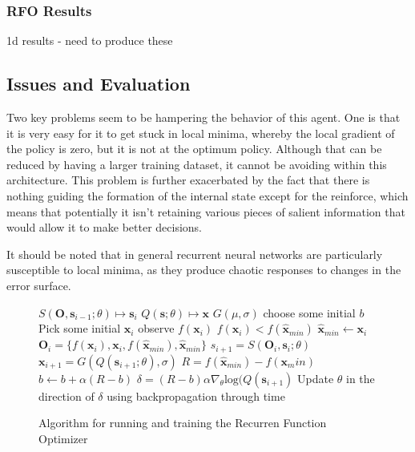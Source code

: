 \subsubsection{RFO Results}
1d results  - need to produce these

\subsection{Issues and Evaluation}
Two key problems seem to be hampering the behavior of this agent. One is that it is very easy for it to get stuck in local minima, whereby the local gradient of the policy is zero, but it is not at the optimum policy. Although that can be reduced by having a larger training dataset, it cannot be avoiding within this architecture. This problem is further exacerbated by the fact that there is nothing guiding the formation of the internal state except for the reinforce, which means that potentially it isn't retaining various pieces of salient information that would allow it to make better decisions.

It should be noted that in general recurrent neural networks are particularly susceptible to local minima, as they produce chaotic responses to changes in the error surface. \cite{rnns} %


\begin{figure}
\centering
\begin{minipage}{.8\textwidth}
\begin{algorithmic}
\State $S(\boldsymbol{O}, \boldsymbol{s}_{i-1}; \theta) \mapsto \boldsymbol{s}_i$
\State $Q(\boldsymbol{s} ;\theta) \mapsto \boldsymbol{x} $
\State $G(\mu,\sigma)$  
\State choose some initial $b$ 
 \Repeat
 	\State Pick some initial $\boldsymbol{x}_i$
 	\Repeat
 		\State observe $f(\boldsymbol{x}_i)$
 		\If $f(\boldsymbol{x}_i) < f(\hat{\boldsymbol{x}}_{min})$
 			\State$ \hat{\boldsymbol{x}}_{min} \gets \boldsymbol{x}_i$
 		\EndIf
 		\State $\boldsymbol{O}_i = \{f(\boldsymbol{x}_i),\boldsymbol{x}_i, f(\hat{\boldsymbol{x}}_{min}), \hat{\boldsymbol{x}}_{min}\} $
 		\State $s_{i+1} = S(\boldsymbol{O}_i, \boldsymbol{s}_{i}; \theta)$
 		\State $\boldsymbol{x}_{i+1} = G(Q(\boldsymbol{s}_{i+1};\theta),\sigma)$ 
	\State $R = f(\hat{\boldsymbol{x}}_{min}) - f(\boldsymbol{x}_min)$
	\State $b \gets b  + \alpha (R - b)$ 
	\State $\delta = (R - b) \alpha \nabla_\theta \text{log}(Q(\boldsymbol{s}_{i+1})$
	\State Update $\theta$ in the direction of $\delta$ using backpropagation through time
 \end{algorithmic}
 \end{minipage}
 \caption{Algorithm for running and training the Recurren Function Optimizer}
 \label{alg:rfo}
\end{figure}

